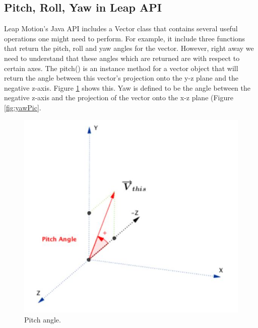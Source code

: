 \subsection{Pitch, Roll, Yaw in Leap API}
Leap Motion's Java API includes a Vector class that contains several useful operations one might need to perform. For example, it include three functions that return the pitch, roll and yaw angles for the vector. However, right away we need to understand that these angles which are returned are with respect to certain axes. The pitch() is an instance method for a vector object that will return the angle between this vector's projection onto the y-z plane and the negative z-axis. Figure \ref{fig:pitchPic} shows this. Yaw is defined to be the angle between the negative z-axis and the projection of the vector onto the x-z plane (Figure \ref{fig:yawPic}. 
\begin{figure}[H]
    \centering
    \begin{minipage}{0.5\textwidth}
        \centering
        \includegraphics[scale=.55]{Figures/4_pitchPic.JPG} 
        \caption[Pitch]{Pitch angle.}
		\label{fig:pitchPic}
    \end{minipage}\hfill
    \begin{minipage}{0.5\textwidth}
        \centering

\end{minipage}
\end{figure}
